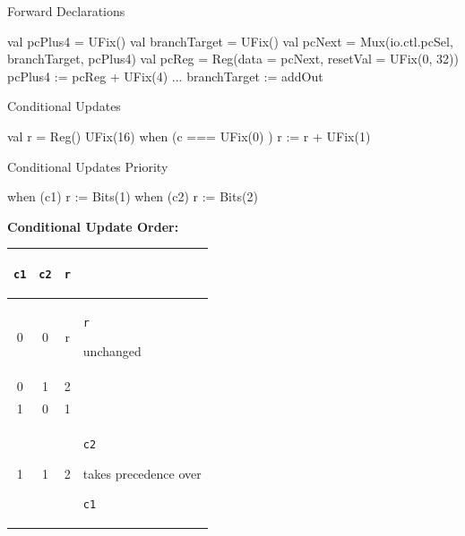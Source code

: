 \documentclass[xcolor=pdflatex,dvipsnames,table]{beamer}
\newcommand{\code}[1]{\begin{footnotesize}{\tt #1}\end{footnotesize}}
\begin{document}
\begin{frame}[fragile]{Forward Declarations}

\begin{scala}
val pcPlus4      = UFix() 
val branchTarget = UFix()
val pcNext       = Mux(io.ctl.pcSel, branchTarget, pcPlus4)
val pcReg        = Reg(data = pcNext, resetVal = UFix(0, 32)) 
pcPlus4         := pcReg + UFix(4) 
... 
branchTarget    := addOut
\end{scala}

\end{frame}

\begin{frame}[fragile]{Conditional Updates}

\begin{scala}
val r = Reg() { UFix(16) }
when (c === UFix(0) ) {
  r := r + UFix(1)
}
\end{scala}

\end{frame}

\begin{frame}[fragile]{Conditional Updates Priority}

\begin{scala}
when (c1) { r := Bits(1) }
when (c2) { r := Bits(2) }
\end{scala}

\textbf{Conditional Update Order:}

\begin{center}
\begin{tabular}{|c|c|c|l|}
\hline
\code{c1} & \code{c2}  &  \code{r} & \\
\hline
0 &  0 & r &  \code{r} unchanged \\
0 &  1 & 2 & \\
1 &  0 & 1 & \\
1 &  1 & 2& \code{c2} takes precedence over \code{c1} \\
\hline
\end{tabular}
\end{center}

\end{frame}
\end{document}
